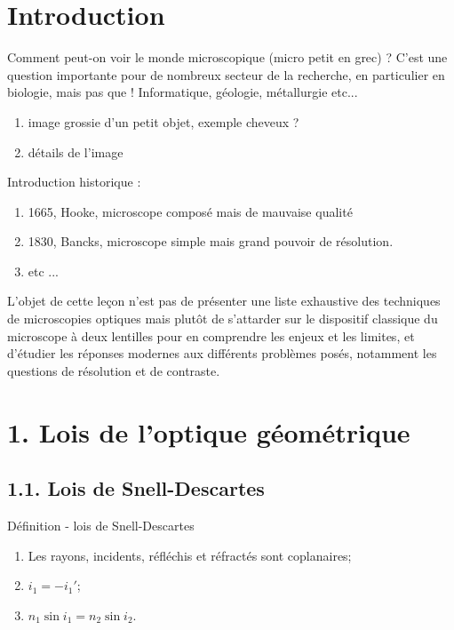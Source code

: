 \documentclass[french, a4paper, 10pt, twocolumn, landscape]{article}
\begin{document}
\hrulefill



\section*{Introduction}

Comment peut-on voir le monde microscopique (micro petit en grec) ? 
C'est une question importante pour de nombreux secteur de la recherche, en particulier en biologie, mais pas que ! 
Informatique, géologie, métallurgie etc... 

\begin{enumerate}
\item image grossie d'un petit objet, exemple cheveux ? 
\item détails de l'image 
\end{enumerate}

Introduction historique : 
\begin{enumerate}
	\item 1665, Hooke, microscope composé mais de mauvaise qualité 
	\item 1830, Bancks, microscope simple mais grand pouvoir de résolution.
	\item etc ...
\end{enumerate}

L’objet de cette leçon n’est pas de présenter une liste exhaustive des techniques de microscopies optiques mais
plutôt de s’attarder sur le dispositif classique du microscope à deux lentilles pour en comprendre les enjeux et les limites, et d’étudier les réponses modernes aux différents problèmes posés, notamment les questions de résolution et
de contraste.

\section*{1. Lois de l'optique géométrique}
\subsection*{1.1. Lois de Snell-Descartes}


	\begin{definition}{Définition - lois de Snell-Descartes}
\begin{enumerate}
			\item Les rayons, incidents, réfléchis et réfractés sont coplanaires;
			\item $i_1 = -i_1'$;
			\item $n_1\sin{i_1} = n_2\sin{i_2}$.
		\end{enumerate}
	\end{definition}
\end{document}
